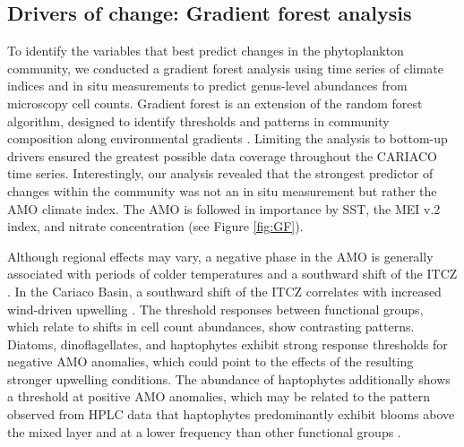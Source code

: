 \documentclass[draft]{agujournal2019}
\begin{document}
\subsection{Drivers of change: Gradient forest analysis}
To identify the variables that best predict changes in the phytoplankton community, we conducted a gradient forest analysis using time series of climate indices and in situ measurements to predict genus-level abundances from microscopy cell counts. Gradient forest is an extension of the random forest algorithm, designed to identify thresholds and patterns in community composition along environmental gradients \cite{ellis_gradient_2012}. Limiting the analysis to bottom-up drivers ensured the greatest possible data coverage throughout the CARIACO time series. Interestingly, our analysis revealed that the strongest predictor of changes within the community was not an in situ measurement but rather the AMO climate index. The AMO is followed in importance by SST, the MEI v.2 index, and nitrate concentration (see Figure \ref{fig:GF}).

Although regional effects may vary, a negative phase in the AMO is generally associated with periods of colder temperatures and a southward shift of the ITCZ \cite{knight_climate_2006, colna2017latitudinal}. In the Cariaco Basin, a southward shift of the ITCZ correlates with increased wind-driven upwelling \cite{taylor_ecosystem_2012}. The threshold responses between functional groups, which relate to shifts in cell count abundances, show contrasting patterns. Diatoms, dinoflagellates, and haptophytes exhibit strong response thresholds for negative AMO anomalies, which could point to the effects of the resulting stronger upwelling conditions. The abundance of haptophytes additionally shows a threshold at positive AMO anomalies, which may be related to the pattern observed from HPLC data that haptophytes predominantly exhibit blooms above the mixed layer and at a lower frequency than other functional groups \cite{pinckney_phytoplankton_2015}. 
\end{document}
